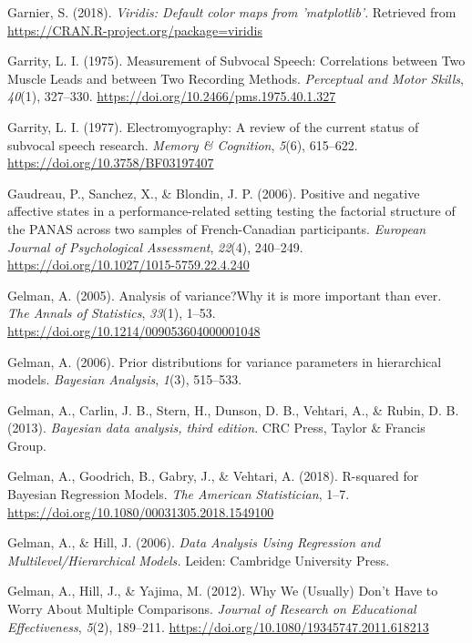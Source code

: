 \documentclass[a4paper,12pt,twoside,onecolumn,openright,final,oldfontcommands]{memoir}
\begin{document}
\leavevmode\hypertarget{ref-R-viridis}{}%
Garnier, S. (2018). \emph{Viridis: Default color maps from 'matplotlib'}. Retrieved from \url{https://CRAN.R-project.org/package=viridis}

\leavevmode\hypertarget{ref-garrity_measurement_1975}{}%
Garrity, L. I. (1975). Measurement of Subvocal Speech: Correlations between Two Muscle Leads and between Two Recording Methods. \emph{Perceptual and Motor Skills}, \emph{40}(1), 327--330. \url{https://doi.org/10.2466/pms.1975.40.1.327}

\leavevmode\hypertarget{ref-garrity_electromyography_1977}{}%
Garrity, L. I. (1977). Electromyography: A review of the current status of subvocal speech research. \emph{Memory \& Cognition}, \emph{5}(6), 615--622. \url{https://doi.org/10.3758/BF03197407}

\leavevmode\hypertarget{ref-Gaudreau2006}{}%
Gaudreau, P., Sanchez, X., \& Blondin, J. P. (2006). Positive and negative affective states in a performance-related setting testing the factorial structure of the PANAS across two samples of French-Canadian participants. \emph{European Journal of Psychological Assessment}, \emph{22}(4), 240--249. \url{https://doi.org/10.1027/1015-5759.22.4.240}

\leavevmode\hypertarget{ref-gelman_analysis_2005}{}%
Gelman, A. (2005). Analysis of variance?Why it is more important than ever. \emph{The Annals of Statistics}, \emph{33}(1), 1--53. \url{https://doi.org/10.1214/009053604000001048}

\leavevmode\hypertarget{ref-gelman_prior_2006}{}%
Gelman, A. (2006). Prior distributions for variance parameters in hierarchical models. \emph{Bayesian Analysis}, \emph{1}(3), 515--533.

\leavevmode\hypertarget{ref-gelman_bayesian_2013}{}%
Gelman, A., Carlin, J. B., Stern, H., Dunson, D. B., Vehtari, A., \& Rubin, D. B. (2013). \emph{Bayesian data analysis, third edition}. CRC Press, Taylor \& Francis Group.

\leavevmode\hypertarget{ref-gelman_r-squared_2018}{}%
Gelman, A., Goodrich, B., Gabry, J., \& Vehtari, A. (2018). R-squared for Bayesian Regression Models. \emph{The American Statistician}, 1--7. \url{https://doi.org/10.1080/00031305.2018.1549100}

\leavevmode\hypertarget{ref-gelman_data_2006}{}%
Gelman, A., \& Hill, J. (2006). \emph{Data Analysis Using Regression and Multilevel/Hierarchical Models.} Leiden: Cambridge University Press.

\leavevmode\hypertarget{ref-gelman_why_2012}{}%
Gelman, A., Hill, J., \& Yajima, M. (2012). Why We (Usually) Don't Have to Worry About Multiple Comparisons. \emph{Journal of Research on Educational Effectiveness}, \emph{5}(2), 189--211. \url{https://doi.org/10.1080/19345747.2011.618213}
\end{document}
